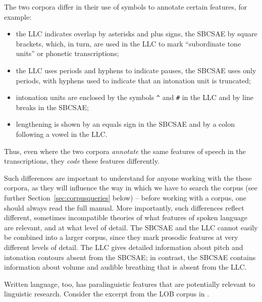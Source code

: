 The two corpora differ in their use of symbols to annotate  certain features, for example:
\begin{itemize}
\item the LLC  indicates overlap by asterisks and plus signs, the SBCSAE  by square brackets, which, in turn, are used in the LLC to mark ``subordinate tone units'' or phonetic  transcriptions;
\item the LLC  uses periods and hyphens to indicate pauses, the SBCSAE  uses only periods, with hyphens used to indicate that an intonation  unit is truncated;
\item intonation units are enclosed by the symbols \texttt{\^{}} and \texttt{\#} in the LLC  and by line breaks in the  SBCSAE;
\item lengthening is shown by an equals sign in the SBCSAE  and by a colon following a vowel  in the  LLC.
\end{itemize}

Thus, even where the two corpora \emph{annotate}  the same features of speech  in the transcriptions,  they \emph{code}  these features differently.

Such differences are important to understand for anyone working with the these corpora, as they will influence the way in which we have to search the corpus (see further Section~\ref{sec:corpusqueries} below) -- before working with a corpus, one should always read the full manual. More importantly, such differences reflect different, sometimes incompatible theories of what features of spoken  language are relevant, and at what level of detail. The SBCSAE  and the LLC  cannot easily be combined into a larger corpus, since they mark prosodic features at very different levels of detail. The LLC  gives detailed information about pitch and intonation  contours absent from the SBCSAE;  in contrast, the SBCSAE  contains information about volume and audible breathing that is absent from the  LLC.

 Written  language, too, has paralinguistic  features that are potentially relevant to linguistic research. Consider the excerpt from the LOB  corpus in .

